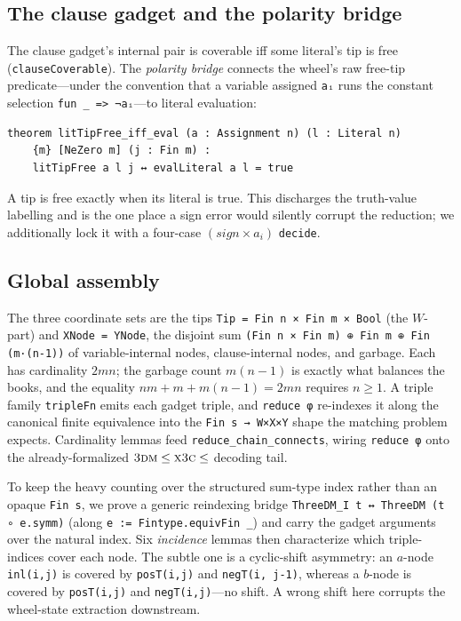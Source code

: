 \documentclass[a4paper,UKenglish,cleveref,autoref]{lipics-v2021}
\begin{document}
\subsection{The clause gadget and the polarity bridge}\label{sec:clause}

The clause gadget's internal pair is coverable iff some literal's tip is free (\lstinline{clauseCoverable}).
The \emph{polarity bridge} connects the wheel's raw free-tip predicate---under the convention that a variable
assigned \lstinline{aᵢ} runs the constant selection \lstinline{fun _ => ¬aᵢ}---to literal evaluation:
\begin{lstlisting}
theorem litTipFree_iff_eval (a : Assignment n) (l : Literal n)
    {m} [NeZero m] (j : Fin m) :
    litTipFree a l j ↔ evalLiteral a l = true
\end{lstlisting}
A tip is free exactly when its literal is true. This discharges the truth-value labelling and is the one place
a sign error would silently corrupt the reduction; we additionally lock it with a four-case
$(\mathit{sign} \times a_i)$ \lstinline{decide}.

\subsection{Global assembly}\label{sec:assembly}

The three coordinate sets are the tips \lstinline{Tip = Fin n × Fin m × Bool} (the $W$-part) and
\lstinline{XNode = YNode}, the disjoint sum \lstinline{(Fin n × Fin m) ⊕ Fin m ⊕ Fin (m·(n-1))} of
variable-internal nodes, clause-internal nodes, and garbage. Each has cardinality $2mn$; the garbage count $m(n{-}1)$ is exactly what balances the
books, and the equality $n m + m + m(n{-}1) = 2mn$ requires $n \ge 1$. A triple family \lstinline{tripleFn}
emits each gadget triple, and \lstinline{reduce φ} re-indexes it along the canonical finite equivalence into the
\lstinline{Fin s → W×X×Y} shape the matching problem expects. Cardinality lemmas feed
\lstinline{reduce_chain_connects}, wiring \lstinline{reduce φ} onto the already-formalized
$\textsc{3dm} \le \textsc{x3c} \le$ decoding tail.

To keep the heavy counting over the structured sum-type index rather than an opaque \lstinline{Fin s}, we prove
a generic reindexing bridge \lstinline{ThreeDM_I t ↔ ThreeDM (t ∘ e.symm)} (along
\lstinline{e := Fintype.equivFin _}) and carry the gadget arguments over the natural index. Six \emph{incidence}
lemmas then characterize which triple-indices cover each node. The subtle one is a cyclic-shift asymmetry: an
$a$-node \lstinline{inl(i,j)} is covered by \lstinline{posT(i,j)} and \lstinline{negT(i, j-1)}, whereas a
$b$-node is covered by \lstinline{posT(i,j)} and \lstinline{negT(i,j)}---no shift. A wrong shift here corrupts
the wheel-state extraction downstream.
\end{document}
